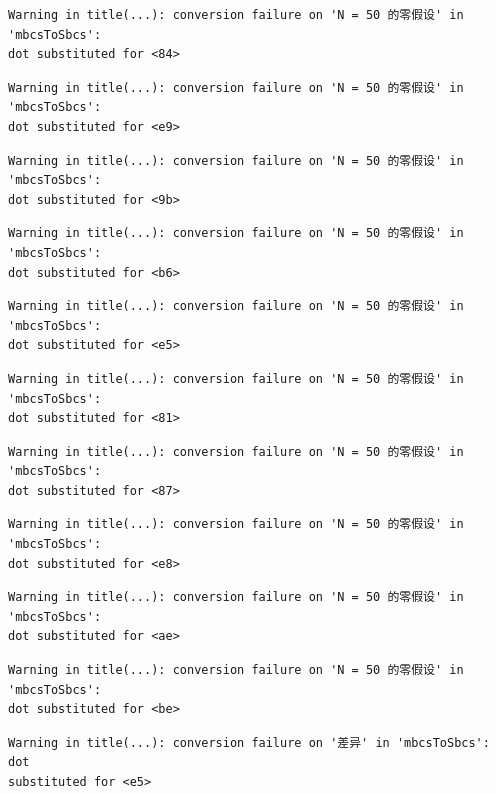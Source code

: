 \documentclass[
  letterpaper,
  DIV=11,
  numbers=noendperiod]{scrreprt}
\begin{document}
\begin{verbatim}
Warning in title(...): conversion failure on 'N = 50 的零假设' in 'mbcsToSbcs':
dot substituted for <84>
\end{verbatim}

\begin{verbatim}
Warning in title(...): conversion failure on 'N = 50 的零假设' in 'mbcsToSbcs':
dot substituted for <e9>
\end{verbatim}

\begin{verbatim}
Warning in title(...): conversion failure on 'N = 50 的零假设' in 'mbcsToSbcs':
dot substituted for <9b>
\end{verbatim}

\begin{verbatim}
Warning in title(...): conversion failure on 'N = 50 的零假设' in 'mbcsToSbcs':
dot substituted for <b6>
\end{verbatim}

\begin{verbatim}
Warning in title(...): conversion failure on 'N = 50 的零假设' in 'mbcsToSbcs':
dot substituted for <e5>
\end{verbatim}

\begin{verbatim}
Warning in title(...): conversion failure on 'N = 50 的零假设' in 'mbcsToSbcs':
dot substituted for <81>
\end{verbatim}

\begin{verbatim}
Warning in title(...): conversion failure on 'N = 50 的零假设' in 'mbcsToSbcs':
dot substituted for <87>
\end{verbatim}

\begin{verbatim}
Warning in title(...): conversion failure on 'N = 50 的零假设' in 'mbcsToSbcs':
dot substituted for <e8>
\end{verbatim}

\begin{verbatim}
Warning in title(...): conversion failure on 'N = 50 的零假设' in 'mbcsToSbcs':
dot substituted for <ae>
\end{verbatim}

\begin{verbatim}
Warning in title(...): conversion failure on 'N = 50 的零假设' in 'mbcsToSbcs':
dot substituted for <be>
\end{verbatim}

\begin{verbatim}
Warning in title(...): conversion failure on '差异' in 'mbcsToSbcs': dot
substituted for <e5>
\end{verbatim}
\end{document}
